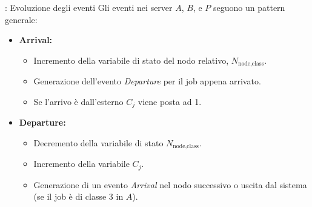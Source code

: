 \begin{frame}{\subsecname: Evoluzione degli eventi}
    Gli eventi nei server \( A \), \( B \), e \( P \) seguono un pattern generale:
    \begin{itemize}
        \item \textbf{Arrival:}
        \begin{itemize}
            \item Incremento della variabile di stato del nodo relativo, \( N_{\text{node,class}} \).
            \item Generazione dell'evento \textit{Departure} per il job appena arrivato.
            \item Se l'arrivo è dall'esterno $C_j$ viene posta ad 1.
        \end{itemize}
        \item \textbf{Departure:}
        \begin{itemize}
            \item Decremento della variabile di stato \( N_{\text{node,class}} \).
            \item Incremento della variabile $C_j$.
            \item Generazione di un evento \textit{Arrival} nel nodo successivo o uscita dal sistema (se il job è di classe 3 in \( A \)).
        \end{itemize}
    \end{itemize}
\end{frame}